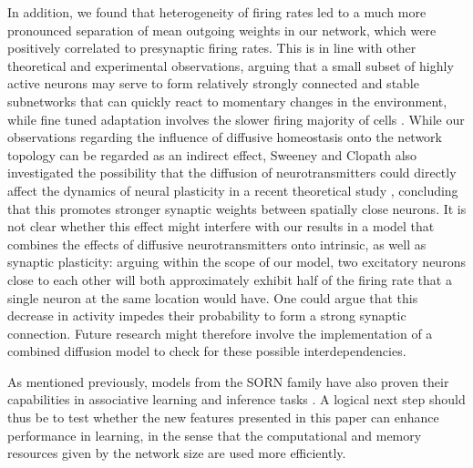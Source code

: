 \documentclass[10pt,letterpaper]{article}
\begin{document}
In addition, we found that heterogeneity of firing rates led to a much more pronounced separation of mean outgoing weights in our network, which were positively correlated to presynaptic firing rates. This is in line with other theoretical and experimental observations, arguing that a small subset of highly active neurons may serve to form relatively strongly connected and stable subnetworks that can quickly react to momentary changes in the environment, while fine tuned adaptation involves the slower firing majority of cells \cite{Buzsaki_Fir_Rates_2014,Yassin_Subnetworks_2010,Dragoi_2003}. While our observations regarding the influence of diffusive homeostasis onto the network topology can be regarded as an indirect effect, Sweeney and Clopath also investigated the possibility that the diffusion of neurotransmitters could directly affect the dynamics of neural plasticity in a recent theoretical study \cite{Sweeney_2017}, concluding that this promotes stronger synaptic weights between spatially close neurons. It is not clear whether this effect might interfere with our results in a model that combines the effects of diffusive neurotransmitters onto intrinsic, as well as synaptic plasticity: arguing within the scope of our model, two excitatory neurons close to each other will both approximately exhibit half of the firing rate that a single neuron at the same location would have. One could argue that this decrease in activity impedes their probability to form a strong synaptic connection. Future research might therefore involve the implementation of a combined diffusion model to check for these possible interdependencies.

As mentioned previously, models from the SORN family have also proven their capabilities in associative learning and inference tasks \cite{Hartmann_2016}. A logical next step should thus be to test whether the new features presented in this paper can enhance performance in learning, in the sense that the computational and memory resources given by the network size are used more efficiently.

\end{document}
